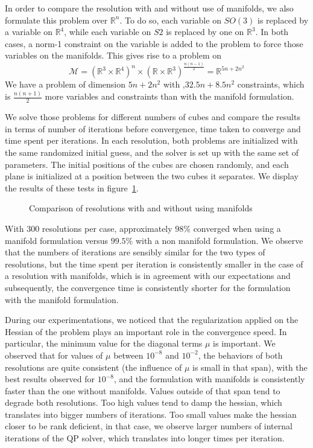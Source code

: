 In order to compare the resolution with and without use of manifolds, we also formulate this problem over $\mathbb{R}^n$.
To do so, each variable on $SO(3)$ is replaced by a variable on $\mathbb{R}^4$, while each variable on $S2$ is replaced by one on $\mathbb{R}^3$.
In both cases, a norm-1 constraint on the variable is added to the problem to force those variables on the manifolds.
This gives rise to a problem on
\begin{equation}
  \mathcal{M}={\left( \mathbb{R}^3\times \mathbb{R}^4 \right)}^n \times {\left( \mathbb{R} \times \mathbb{R}^3 \right)}^{\frac{n(n-1)}{2}} = \mathbb{R}^{5n+2n^2} \nonumber
\end{equation}
We have a problem of dimension $5n+2n^2$ with ,$32.5n+8.5n^2$ constraints, which is $\frac{n(n+1)}{2}$ more variables and constraints than with the manifold formulation.

We solve those problems for different numbers of cubes and compare the results in terms of number of iterations before convergence, time taken to converge and time spent per iterations.
In each resolution, both problems are initialized with the same randomized initial guess, and the solver is set up with the same set of parameters.
The initial positions of the cubes are chosen randomly, and each plane is initialized at a position between the two cubes it separates.
We display the results of these tests in figure~\ref{fig:timings-cubes}.

\begin{figure}[htpb]
  \centering
  
  \caption{Comparison of resolutions with and without using manifolds}
\label{fig:timings-cubes}
\end{figure}

With 300 resolutions per case, approximately $98\%$ converged when using a manifold formulation versus $99.5\%$ with a non manifold formulation.
We observe that the numbers of iterations are sensibly similar for the two types of resolutions, but the time spent per iteration is consistently smaller in the case of a resolution with manifolds, which is in agreement with our expectations and subsequently, the convergence time is consistently shorter for the formulation with the manifold formulation.

During our experimentations, we noticed that the regularization applied on the Hessian of the problem plays an important role in the convergence speed.
In particular, the minimum value for the diagonal terms $\mu$ is important.
We observed that for values of $\mu$ between $10^{-8}$ and $10^{-2}$, the behaviors of both resolutions are quite consistent (the influence of $\mu$ is small in that span), with the best results observed for $10^{-8}$, and the formulation with manifolds is consistently faster than the one without manifolds.
Values outside of that span tend to degrade both resolutions.
Too high values tend to damp the hessian, which translates into bigger numbers of iterations.
Too small values make the hessian closer to be rank deficient, in that case, we observe larger numbers of internal iterations of the QP solver, which translates into longer times per iteration.

